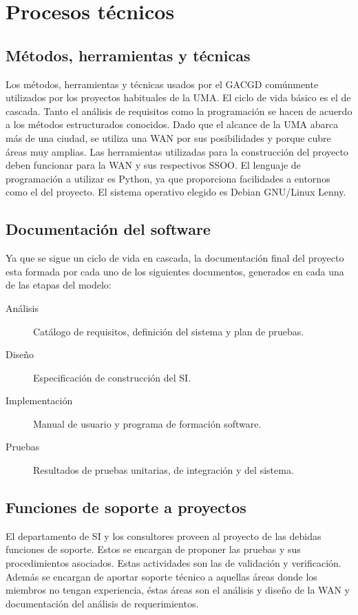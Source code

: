 \documentclass[11pt,a4paper,spanish,twoside]{report}
\begin{document}
\chapter{Procesos técnicos}
\section{Métodos, herramientas y técnicas}
Los métodos, herramientas y técnicas usados por el GACGD comúnmente 
utilizados por los proyectos habituales de la UMA. El ciclo de vida básico es 
el de cascada. Tanto el análisis de requisitos como la programación se hacen 
de acuerdo a los métodos estructurados conocidos. Dado que el alcance de la 
UMA abarca más de una ciudad, se utiliza una WAN por sus posibilidades y 
porque cubre áreas muy amplias. Las herramientas utilizadas para la 
construcción del proyecto deben funcionar para la WAN y sus respectivos SSOO. 
El lenguaje de programación a utilizar es Python, ya que proporciona 
facilidades a entornos como el del proyecto. El sistema operativo elegido es 
Debian GNU/Linux Lenny.

\section{Documentación del software}
Ya que se sigue un ciclo de vida en cascada, la documentación final del 
proyecto esta formada por cada uno de los siguientes documentos, generados en 
cada una de las etapas del modelo:

\begin{description}
\item[Análisis] Catálogo de requisitos, definición del sistema y plan de
  pruebas.  
\item[Diseño] Especificación de construcción del SI.
\item[Implementación] Manual de usuario y programa de formación software. 
\item[Pruebas] Resultados de pruebas unitarias, de integración y del sistema.
\end{description}

\section{Funciones de soporte a proyectos}
El departamento de SI y los consultores proveen al proyecto de las debidas 
funciones de soporte. Estos se encargan de proponer las pruebas y sus 
procedimientos asociados. Estas actividades son las de validación y 
verificación. Además se encargan de aportar soporte técnico a aquellas áreas 
donde los miembros no tengan experiencia, éstas áreas son el análisis y diseño 
de la WAN y documentación del análisis de requerimientos.
\end{document}

